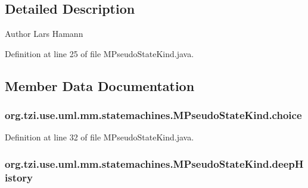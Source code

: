 \subsection{Detailed Description}
\begin{DoxyAuthor}{Author}
Lars Hamann 
\end{DoxyAuthor}


Definition at line 25 of file M\-Pseudo\-State\-Kind.\-java.



\subsection{Member Data Documentation}
\hypertarget{enumorg_1_1tzi_1_1use_1_1uml_1_1mm_1_1statemachines_1_1_m_pseudo_state_kind_a9f7b1db9a652d8d626a516783f41375e}{
\subsubsection[{choice}]{\setlength{\rightskip}{0pt plus 5cm}org.\-tzi.\-use.\-uml.\-mm.\-statemachines.\-M\-Pseudo\-State\-Kind.\-choice}}\label{enumorg_1_1tzi_1_1use_1_1uml_1_1mm_1_1statemachines_1_1_m_pseudo_state_kind_a9f7b1db9a652d8d626a516783f41375e}


Definition at line 32 of file M\-Pseudo\-State\-Kind.\-java.

\hypertarget{enumorg_1_1tzi_1_1use_1_1uml_1_1mm_1_1statemachines_1_1_m_pseudo_state_kind_a65500e58e48cf9e5367e94367f60afbf}{
\subsubsection[{deep\-History}]{\setlength{\rightskip}{0pt plus 5cm}org.\-tzi.\-use.\-uml.\-mm.\-statemachines.\-M\-Pseudo\-State\-Kind.\-deep\-History}}\label{enumorg_1_1tzi_1_1use_1_1uml_1_1mm_1_1statemachines_1_1_m_pseudo_state_kind_a65500e58e48cf9e5367e94367f60afbf}


